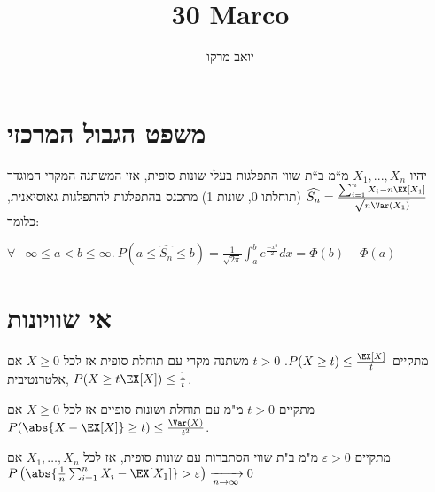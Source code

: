 \documentclass[8pt,twocolumn]{extarticle}
\title{30 Marco}
\author{יואב מרקו}
\begin{document}
\section{משפט הגבול המרכזי}
יהיו $X_{1},...,X_{n}$ מ“מ ב“ת שווי התפלגות בעלי שונות
סופית, אזי המשתנה המקרי המוגדר $\widehat{S_{n}}=\frac{\sum_{i=1}^{n}X_{i}-n\EX\left[X_{1}\right]}{\sqrt{n\Var\left(X_{1}\right)}}$
(תוחלתו 0, שונות 1) מתכנס בהתפלגות להתפלגות גאוסיאנית, כלומר:

\hspace*{\fill}
\(\displaystyle
\forall -\infty\leq a<b\leq\infty.\
P\left(a\leq\widehat{S_{n}}\leq b\right)=\frac{1}{\sqrt{2\pi}}\int_{a}^{b}e^{\frac{-x^{2}}{2}}dx=\varPhi\left(b\right)-\varPhi\left(a\right)\)

\section{אי שוויונות}
\begin{claim}[א"ש מרקוב]
  אם ‎\(X\geq 0\) משתנה מקרי עם תוחלת סופית אז לכל ‎\(t>0\) מתקיים \(P(X\geq t) \leq  \frac{\EX[X]}{t}\).
  אלטרנטיבית, \(P(X \geq t \EX[X]) \leq \frac{1}{t}\).
\end{claim}
\begin{claim}[א"ש צ'בישב]
  אם ‎\(X\geq 0\) מ"מ עם תוחלת ושונות סופיים
  אז לכל ‎\(t>0\) מתקיים ‎\( P(\abs{X - \EX[X]} \geq t) \leq \frac{\Var(X)}{t^2} \).
 \end{claim}
\begin{theorem}
אם ‎\(X_1, \dots ,X_n\) מ"מ ב"ת שווי הסתברות עם שונות סופית, אז לכל ‎\(\varepsilon >0\) מתקיים
\hspace*{\fill}
‎\( P\left(\abs{\frac{1}{n} \sum_{i=1}^n X_i - \EX[X_1]} > \varepsilon\right)\xrightarrow[n\rightarrow\infty]{} 0 \)
\hspace*{\fill}
\end{theorem}
\end{document}
